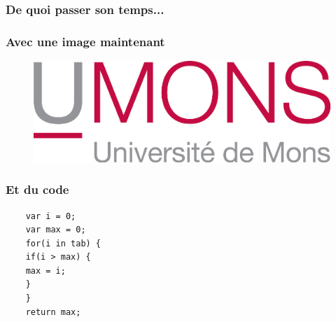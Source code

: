 \documentclass[12pt]{beamer}
\begin{document}
	\begin{frame}
		\frametitle{De quoi passer son temps...}
	\end{frame}
	\begin{frame}
		\frametitle{Avec une image maintenant}
		\begin{figure}[b]
			\includegraphics[scale=0.6,angle=90]{umons.png}
		\end{figure}
	\end{frame}
	\begin{frame}
		\frametitle{Et du code}
	\end{frame}
	\begin{verbatim}
	var i = 0;
	var max = 0;
	for(i in tab) {
	if(i > max) {
	max = i;
	}
	}
	return max;
	\end{verbatim}
\end{document}
